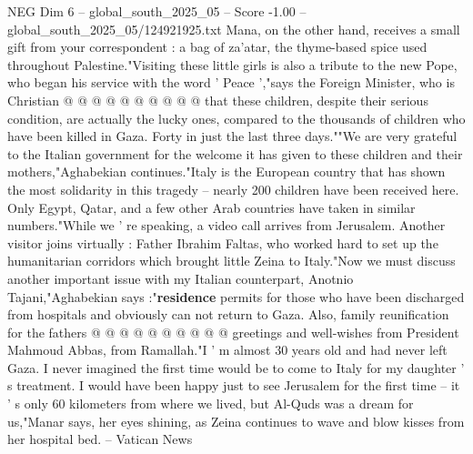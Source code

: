 \begin{textsample}{NEG Dim 6 – global\_south\_2025\_05 – Score -1.00 – global\_south\_2025\_05/124921925.txt}
Mana, on the other hand, receives a small gift from your correspondent : a bag of za'atar, the thyme-based spice used throughout Palestine."Visiting these little girls is also a tribute to the new Pope, who began his service with the word ' Peace ',"says the Foreign Minister, who is Christian @ @ @ @ @ @ @ @ @ @ that these children, despite their serious condition, are actually the lucky ones, compared to the thousands of children who have been killed in Gaza.
Forty in just the last three days.""We are very grateful to the Italian government for the welcome it has given to these children and their mothers,"Aghabekian continues."Italy is the European country that has shown the most solidarity in this tragedy -- nearly 200 children have been received here.
Only Egypt, Qatar, and a few other Arab countries have taken in similar numbers."While we ' re speaking, a video call arrives from Jerusalem.
Another visitor joins virtually : Father Ibrahim Faltas, who worked hard to set up the humanitarian corridors which brought little Zeina to Italy."Now we must discuss another important issue with my Italian counterpart, Anotnio Tajani,"Aghabekian says :"\textbf{residence} permits for those who have been discharged from hospitals and obviously can not return to Gaza.
Also, family reunification for the fathers @ @ @ @ @ @ @ @ @ @ greetings and well-wishes from President Mahmoud Abbas, from Ramallah."I ' m almost 30 years old and had never left Gaza.
I never imagined the first time would be to come to Italy for my daughter ' s treatment.
I would have been happy just to see Jerusalem for the first time -- it ' s only 60 kilometers from where we lived, but Al-Quds was a dream for us,"Manar says, her eyes shining, as Zeina continues to wave and blow kisses from her hospital bed. -- Vatican News

\end{textsample}
